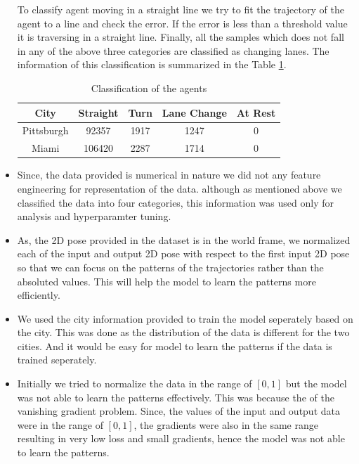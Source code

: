 \documentclass{article}
\begin{document}
\begin{itemize}
  To classify agent moving in a straight line we try to fit the trajectory of the agent to a line and check the error. If the error is less than a threshold value
  it is traversing in a straight line. Finally, all the samples which does not fall in any of the above three categories are classified as changing lanes.
  The information of this classification is summarized in the Table \ref{tab:classification}.
  \begin{table}
    \centering
    \begin{tabular}{|c|c|c|c|c|}
      \hline
      City & Straight & Turn & Lane Change & At Rest \\
      \hline
      Pittsburgh & 92357 & 1917 & 1247 & 0 \\
      \hline
      Miami &  106420 & 2287 & 1714 & 0 \\
      \hline
    \end{tabular}
    \caption{Classification of the agents}
    \label{tab:classification}
  \end{table}
  \item Since, the data provided is numerical in nature we did not any feature engineering for representation of the data. although as mentioned above we classified the data into four categories,
  this information was used only for analysis and hyperparamter tuning.
  \item As, the 2D pose provided in the dataset is in the world frame, we normalized each of the input and output 2D pose with respect to the first input 2D pose so that we can focus on the 
  patterns of the trajectories rather than the absoluted values. This will help the model to learn the patterns more efficiently. 
  \item We used the city information provided to train the model seperately based on the city. This was done as the distribution of the data is different for the two cities.
  And it would be easy for model to learn the patterns if the data is trained seperately.
  \item Initially we tried to normalize the data in the range of $[0, 1]$ but the model was not able to learn the patterns effectively. This was because the of the vanishing gradient problem. 
  Since, the values of the input and output data were in the range of $[0, 1]$, the gradients were also in the same range resulting in very low loss and small gradients, hence the model was not able to learn the patterns.
\end{itemize}
\end{document}
